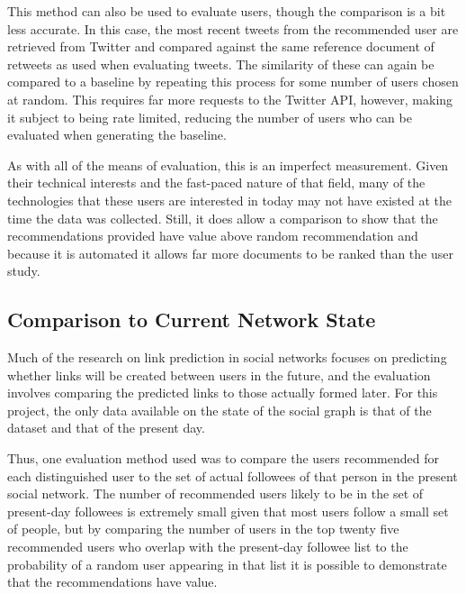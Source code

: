 This method can also be used to evaluate users, though the comparison is a bit less accurate. In this case, the most recent tweets from the recommended user are retrieved from Twitter and compared against the same reference document of retweets as used when evaluating tweets. The similarity of these can again be compared to a baseline by repeating this process for some number of users chosen at random. This requires far more requests to the Twitter API, however, making it subject to being rate limited, reducing the number of users who can be evaluated when generating the baseline.

As with all of the means of evaluation, this is an imperfect measurement. Given their technical interests and the fast-paced nature of that field, many of the technologies that these users are interested in today may not have existed at the time the data was collected. Still, it does allow a comparison to show that the recommendations provided have value above random recommendation and because it is automated it allows far more documents to be ranked than the user study.

\subsection{Comparison to Current Network State}

Much of the research on link prediction in social networks focuses on predicting whether links will be created between users in the future, and the evaluation involves comparing the predicted links to those actually formed later. For this project, the only data available on the state of the social graph is that of the dataset and that of the present day.

Thus, one evaluation method used was to compare the users recommended for each distinguished user to the set of actual followees of that person in the present social network. The number of recommended users likely to be in the set of present-day followees is extremely small given that most users follow a small set of people, but by comparing the number of users in the top twenty five recommended users who overlap with the present-day followee list to the probability of a random user appearing in that list it is possible to demonstrate that the recommendations have value.




